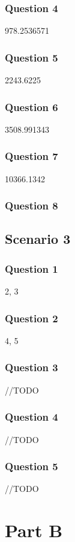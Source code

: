 \documentclass[11pt, oneside, a4paper]{article}
\begin{document}
\subsubsection*{Question 4}
978.2536571

\subsubsection*{Question 5}
2243.6225

\subsubsection*{Question 6}
3508.991343

\subsubsection*{Question 7}
10366.1342

\subsubsection*{Question 8}

\subsection*{Scenario 3}
\subsubsection*{Question 1}
2, 3

\subsubsection*{Question 2}
4, 5

\subsubsection*{Question 3}
//TODO

\subsubsection*{Question 4}
//TODO

\subsubsection*{Question 5}
//TODO

\newpage
\section*{Part B}
\end{document}
